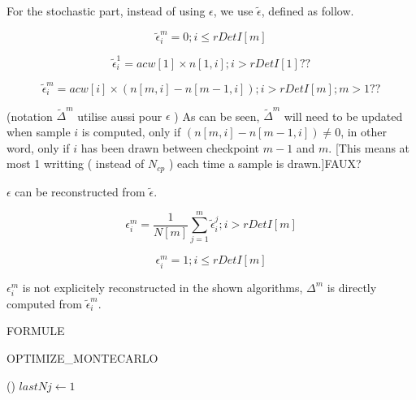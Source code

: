 \documentclass[./thesis.tex]{subfiles}
\begin{document}
For the stochastic part, instead of using $\epsilon$, we use $\tilde \epsilon$, defined as follow.


\begin{equation}
\tilde \epsilon^m_i = 0 ; i \leq rDetI[m]
\end{equation}



\begin{equation}
\tilde \epsilon^1_i = acw[1] \times n[1,i]  ; i>rDetI[1] ??
\end{equation}



\begin{equation}
\tilde \epsilon^m_i = acw[i] \times (n[m,i]-n[m-1,i])  ; i>rDetI[m]; m>1 ??
\end{equation}


(notation  $\tilde \Delta^m$ utilise aussi pour $\epsilon$ )
As can be seen, $\tilde \Delta^m$ will need to be updated when sample $i$ is computed, only if $(n[m,i]-n[m-1,i]) \neq 0$, in other word, only if $i$ has been drawn between checkpoint $m-1$ and $m$. [This means at most 1 writting ( instead of $N_{cp}$ ) each time a sample is drawn.]FAUX? 

$\epsilon$ can be reconstructed from $\tilde \epsilon$.




\begin{equation}
\epsilon^m_i = \frac{1}{N[m]} \sum_{j=1}^{m} {\tilde \epsilon^j_i} ; i > rDetI[m]
\end{equation}


\begin{equation}
\epsilon^m_i = 1; i \leq rDetI[m]
\end{equation}



$\epsilon^m_i$ is not explicitely reconstructed in the shown algorithms, $\Delta^m$ is directly computed from $\tilde \epsilon^m_i$.

FORMULE


\begin{algorithm}
	\caption{OPTIMIZE\_MONTECARLO}
	\label{OPTIMIZE_MONTECARLO}
	
	
	\Fn(){}{
		$lastNj \gets 1$ \;
	}
\end{algorithm}
\end{document}
